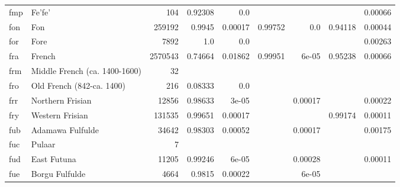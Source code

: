 \documentclass[11pt]{article}
\begin{document}
\begin{table*}[h]
{\begin{tabular}{llrrrrrrr}
fmp         & Fe'fe'         & 104         & 0.92308         & 0.0         &          &          &          & 0.00066         \\

fon         & Fon         & 259192         & 0.9945         & 0.00017         & 0.99752         & 0.0         & 0.94118         & 0.00044         \\

for         & Fore         & 7892         & 1.0         & 0.0         &          &          &          & 0.00263         \\

fra         & French         & 2570543         & 0.74664         & 0.01862         & 0.99951         & 6e-05         & 0.95238         & 0.00066         \\

frm         & Middle French (ca. 1400-1600)         & 32         &          &          &          &          &          &          \\

fro         & Old French (842-ca. 1400)         & 216         & 0.08333         & 0.0         &          &          &          &          \\

frr         & Northern Frisian         & 12856         & 0.98633         & 3e-05         &          & 0.00017         &          & 0.00022         \\

fry         & Western Frisian         & 131535         & 0.99651         & 0.00017         &          &          & 0.99174         & 0.00011         \\

fub         & Adamawa Fulfulde         & 34642         & 0.98303         & 0.00052         &          & 0.00017         &          & 0.00175         \\

fuc         & Pulaar         & 7         &          &          &          &          &          &          \\

fud         & East Futuna         & 11205         & 0.99246         & 6e-05         &          & 0.00028         &          & 0.00011         \\

fue         & Borgu Fulfulde         & 4664         & 0.9815         & 0.00022         &          & 6e-05         &          &          \\


\end{tabular}}
\end{table*}
\end{document}

